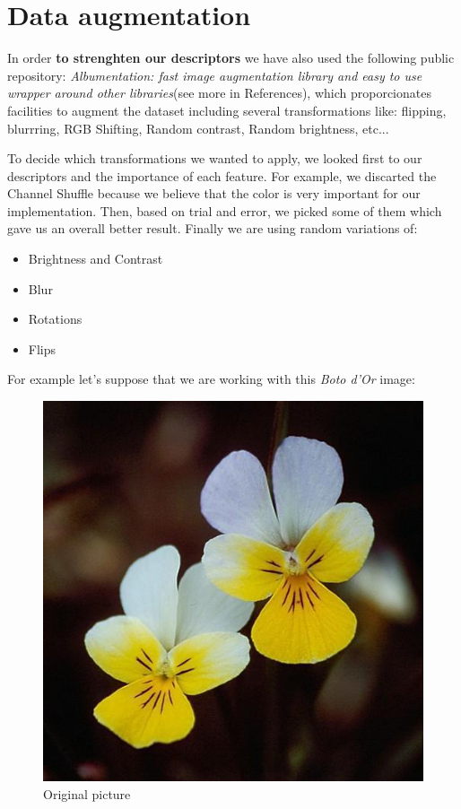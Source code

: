 \documentclass[11]{article}
\begin{document}
\section{Data augmentation}
In order \textbf{to strenghten our descriptors} we have also used the following public repository:  \textit{Albumentation: fast image augmentation library and easy to use wrapper around other libraries}(see more in References), which proporcionates facilities to augment the dataset including several transformations like: flipping, blurrring, RGB Shifting, Random contrast, Random brightness, etc...
\medskip

To decide which transformations we wanted to apply, we looked first to our descriptors and the importance of each feature. For example, we discarted the Channel Shuffle because we believe that the color is very important for our implementation. Then, based on trial and error, we picked some of them which gave us an overall better result. Finally we are using random variations of:
\begin{itemize}
    \item Brightness and Contrast
    \item Blur
    \item Rotations
    \item Flips
\end{itemize}
For example let's suppose that we are working with this \textit{Boto d'Or} image:
\begin{figure}[H]
    \centering
    \includegraphics[scale=0.25]{images/original.jpg}
    \caption{Original picture}
    \label{original}
\end{figure}
\end{document}
